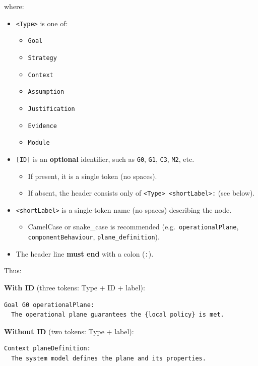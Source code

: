 \documentclass[11pt]{article}
\begin{document}
where:
\begin{itemize}[leftmargin=2em]
  \item \texttt{\textless Type\textgreater{}} is one of:
  \begin{itemize}[leftmargin=1.5em]
    \item \texttt{Goal}
    \item \texttt{Strategy}
    \item \texttt{Context}
    \item \texttt{Assumption}
    \item \texttt{Justification}
    \item \texttt{Evidence}
    \item \texttt{Module}
  \end{itemize}

  \item \texttt{[ID]} is an \textbf{optional} identifier, such as \texttt{G0}, \texttt{G1}, \texttt{C3}, \texttt{M2}, etc.
  \begin{itemize}[leftmargin=1.5em]
    \item If present, it is a single token (no spaces).
    \item If absent, the header consists only of \texttt{\textless Type\textgreater{} \textless shortLabel\textgreater:} (see below).
  \end{itemize}

  \item \texttt{\textless shortLabel\textgreater{}} is a single-token name (no spaces) describing the node.
  \begin{itemize}[leftmargin=1.5em]
    \item CamelCase or snake\_case is recommended (e.g.\ \texttt{operationalPlane}, \texttt{componentBehaviour}, \texttt{plane\_definition}).
  \end{itemize}

  \item The header line \textbf{must end} with a colon (\texttt{:}).
\end{itemize}

Thus:

\textbf{With ID} (three tokens: Type + ID + label):
\begin{verbatim}
Goal G0 operationalPlane:
  The operational plane guarantees the {local policy} is met.
\end{verbatim}

\textbf{Without ID} (two tokens: Type + label):
\begin{verbatim}
Context planeDefinition:
  The system model defines the plane and its properties.
\end{verbatim}
\end{document}
